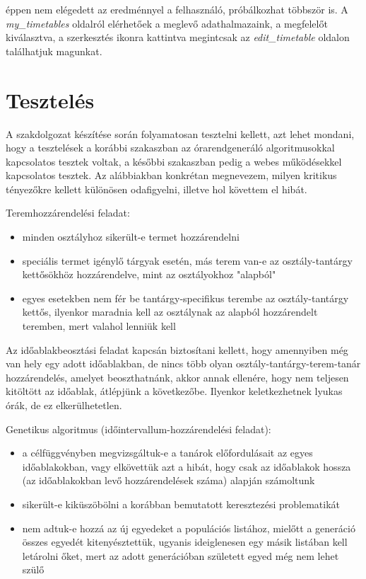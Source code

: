 \documentclass[12pt,a4paper]{report}
\begin{document}
éppen nem elégedett az eredménnyel a felhasználó, próbálkozhat többször is. A \textit{my\_timetables} oldalról elérhetőek a meglevő adathalmazaink, a megfelelőt kiválasztva, a szerkesztés ikonra kattintva megintcsak az \textit{edit\_timetable} oldalon találhatjuk magunkat.

\section{Tesztelés}

A szakdolgozat készítése során folyamatosan tesztelni kellett, azt lehet mondani, hogy a tesztelések a korábbi szakaszban az órarendgeneráló algoritmusokkal kapcsolatos tesztek voltak, a későbbi szakaszban pedig a webes működésekkel kapcsolatos tesztek. Az alábbiakban konkrétan megnevezem, milyen kritikus tényezőkre kellett különösen odafigyelni, illetve hol követtem el hibát.

Teremhozzárendelési feladat:
\begin{itemize}
\item minden osztályhoz sikerült-e termet hozzárendelni
\item speciális termet igénylő tárgyak esetén, más terem van-e az osztály-tantárgy kettősökhöz hozzárendelve, mint az osztályokhoz "alapból"
\item egyes esetekben nem fér be tantárgy-specifikus terembe az osztály-tantárgy kettős, ilyenkor maradnia kell az osztálynak az alapból hozzárendelt teremben, mert valahol lenniük kell
\end{itemize}

Az időablakbeosztási feladat kapcsán biztosítani kellett, hogy amennyiben még van hely egy adott időablakban, de nincs több olyan osztály-tantárgy-terem-tanár hozzárendelés, amelyet  beoszthatnánk, akkor annak ellenére, hogy nem teljesen kitöltött az időablak, átlépjünk a következőbe. Ilyenkor keletkezhetnek lyukas órák, de ez elkerülhetetlen.

Genetikus algoritmus (időintervallum-hozzárendelési feladat):
\begin{itemize}
\item a célfüggvényben megvizsgáltuk-e a tanárok előfordulásait az egyes időablakokban, vagy elkövettük azt a hibát, hogy csak az időablakok hossza (az időablakokban levő hozzárendelések száma) alapján számoltunk
\item sikerült-e kiküszöbölni a korábban bemutatott keresztezési problematikát
\item nem adtuk-e hozzá az új egyedeket a populációs listához, mielőtt a generáció összes egyedét kitenyésztettük, ugyanis ideiglenesen egy másik listában kell letárolni őket, mert az adott generációban született egyed még nem lehet szülő
\end{itemize}
\end{document}
